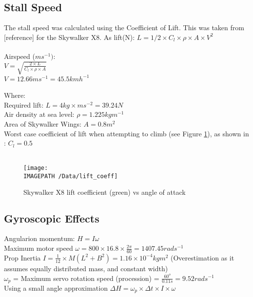 \subsection{Stall Speed}
\label{sec:stall}
The stall speed was calculated using the Coefficient of Lift. This was taken from [reference] for the Skywalker X8.
As lift(N): $L = 1/2\times C_l\times\rho\times A\times V^2$\\\\
Airspeed ($ms^{-1})$:\\
$V= \sqrt{\frac{2\times L}{C_l\times \rho \times A}}$\\
$V = 12.66ms^{-1} = 45.5kmh^{-1}$\\\\
Where:\\
Required lift: $L = 4kg \times ms^{-2} = 39.24N$\\
Air density at sea level: $\rho = 1.225 kgm^{-1}$\\
Area of Skywalker Wings: $A = 0.8m^2$\\
Worst case coefficient of lift when attempting to climb (see Figure \ref{fig:lift}), as shown in \cite{ref:x8aerodynamics}: $C_l = 0.5$
\\\\
\begin{figure}[!ht]
	\centering
	\texttt{[image: \\IMAGEPATH /Data/lift\_coeff]}
	\caption{Skywalker X8 lift coefficient (green) vs angle of attack}
	\label{fig:lift}
\end{figure}

\subsection{Gyroscopic Effects}
\label{sec:gyro}
Angularion momentum: $H = I\omega$\\

Maximum motor speed $\omega = 800\times16.8\times\frac{2\pi}{60} = 1407.45rads^{-1}$\\

Prop Inertia $I = \frac{1}{12}\times M(L^2+B^2) = 1.16\times10^{-4}kgm^2$ (Overestimation as it assumes equally distributed mass, and constant width)\\

$\omega_p$ = Maximum servo rotation speed (procession) = $\frac{60^o}{0.11s} = 9.52rads^{-1}$\\

Using a small angle approximation $\Delta H = \omega_p \times\Delta t \times I \times \omega$\\ 

